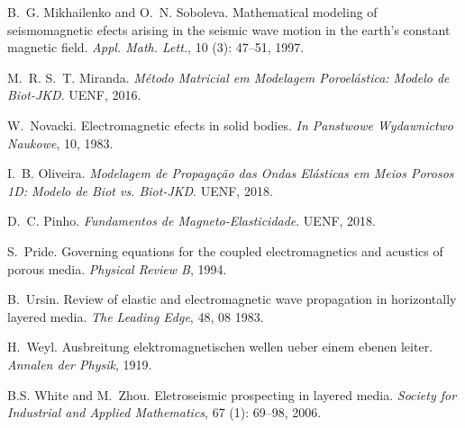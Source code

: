 \documentclass[12pt,a4paper,oneside]{abntex2}
\begin{document}
\begin{thebibliography}{25}
B.~G. Mikhailenko and O.~N. Soboleva.
\newblock Mathematical modeling of seismomagnetic efects arising in the seismic
  wave motion in the earth's constant magnetic field.
\newblock \emph{Appl. Math. Lett.}, 10 (3): 47--51, 1997.

M.~R. S.~T. Miranda.
\newblock \emph{M\'etodo Matricial em Modelagem Poroel\'astica: Modelo de
  Biot-JKD}.
\newblock UENF, 2016.

W.~Novacki.
\newblock Electromagnetic efects in solid bodies.
\newblock \emph{In Panstwowe Wydawnictwo Naukowe}, 10, 1983.

I.~B. Oliveira.
\newblock \emph{Modelagem de Propaga\c{c}\~ao das Ondas El\'asticas em Meios
  Porosos 1D: Modelo de Biot vs. Biot-JKD}.
\newblock UENF, 2018.

D.~C. Pinho.
\newblock \emph{Fundamentos de Magneto-Elasticidade}.
\newblock UENF, 2018.

S.~Pride.
\newblock Governing equations for the coupled electromagnetics and acustics of
  porous media.
\newblock \emph{Physical Review B}, 1994.

B.~Ursin.
\newblock Review of elastic and electromagnetic wave propagation in
  horizontally layered media.
\newblock \emph{The Leading Edge}, 48, 08 1983.

H.~Weyl.
\newblock Ausbreitung elektromagnetischen wellen ueber einem ebenen leiter.
\newblock \emph{Annalen der Physik}, 1919.

B.S. White and M.~Zhou.
\newblock Eletroseismic prospecting in layered media.
\newblock \emph{Society for Industrial and Applied Mathematics}, 67
  (1): 69--98, 2006.



\end{thebibliography}
\end{document}
